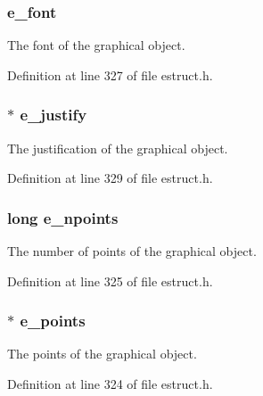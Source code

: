 \hypertarget{struct__egobj_a4bf02b4e1a6c0c7723b5ed198f45e0b0}{
\subsubsection[{e\-\_\-font}]{ e\-\_\-font}}\label{struct__egobj_a4bf02b4e1a6c0c7723b5ed198f45e0b0}
The font of the graphical object. 

Definition at line 327 of file estruct.\-h.

\hypertarget{struct__egobj_a41dc1b542ee19a3171a52480dff2c664}{
\subsubsection[{e\-\_\-justify}]{$\ast$ e\-\_\-justify}}\label{struct__egobj_a41dc1b542ee19a3171a52480dff2c664}
The justification of the graphical object. 

Definition at line 329 of file estruct.\-h.

\hypertarget{struct__egobj_a216eff6ab0216b35e215bd1c1b8fb0d0}{
\subsubsection[{e\-\_\-npoints}]{\setlength{\rightskip}{0pt plus 5cm}long e\-\_\-npoints}}\label{struct__egobj_a216eff6ab0216b35e215bd1c1b8fb0d0}
The number of points of the graphical object. 

Definition at line 325 of file estruct.\-h.

\hypertarget{struct__egobj_a579eafd42827c9bdcddc613774309ad3}{
\subsubsection[{e\-\_\-points}]{$\ast$ e\-\_\-points}}\label{struct__egobj_a579eafd42827c9bdcddc613774309ad3}
The points of the graphical object. 

Definition at line 324 of file estruct.\-h.

